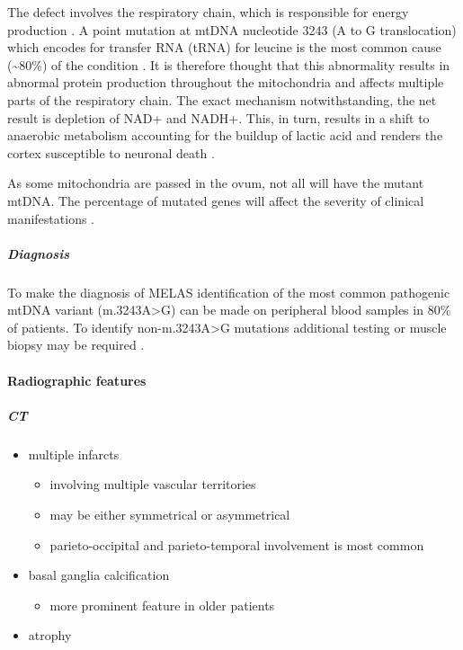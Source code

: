 The defect involves the respiratory chain, which is responsible for energy production . A point mutation at mtDNA nucleotide 3243 (A to G translocation) which encodes for transfer RNA (tRNA) for leucine is the most common cause (\textasciitilde80\%) of the condition . It is therefore thought that this abnormality results in abnormal protein production throughout the mitochondria and affects multiple parts of the respiratory chain. The exact mechanism notwithstanding, the net result is depletion of NAD+ and NADH+. This, in turn, results in a shift to anaerobic metabolism accounting for the buildup of lactic acid and renders the cortex susceptible to neuronal death .

As some mitochondria are passed in the ovum, not all will have the mutant mtDNA. The percentage of mutated genes will affect the severity of clinical manifestations .

\subparagraph{Diagnosis}

To make the diagnosis of MELAS identification of the most common pathogenic mtDNA variant (m.3243A\textgreater G) can be made on peripheral blood samples in 80\% of patients. To identify non-m.3243A\textgreater G mutations additional testing or muscle biopsy may be required .

\paragraph{Radiographic features}


\subparagraph{CT}

\begin{itemize}
	\item
	multiple infarcts
	
	\begin{itemize}
		\item
		involving multiple vascular territories
		\item
		may be either symmetrical or asymmetrical
		\item
		parieto-occipital and parieto-temporal involvement is most common
	\end{itemize}
	\item
	basal ganglia calcification 
	
	\begin{itemize}
		\item
		more prominent feature in older patients
	\end{itemize}
	\item
	atrophy 
\end{itemize}


